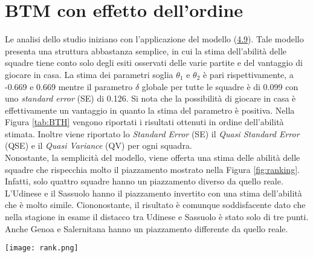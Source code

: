 \section {BTM con effetto dell'ordine}
Le analisi dello studio iniziano con l'applicazione del modello (\hyperref[for:3.9]{4.9}). Tale modello presenta una struttura abbastanza semplice, in cui la stima dell'abilità delle squadre tiene conto solo degli esiti osservati delle varie partite e del vantaggio di giocare in casa. 
La stima dei parametri soglia $\theta_1$ e $\theta_2$ è pari rispettivamente, a -0.669 e 0.669 mentre il parametro $\delta$ globale per tutte le squadre è di 0.099 con uno \emph{standard error} (SE) di 0.126. Si nota che la possibilità di giocare in casa è effettivamente un vantaggio in quanto la stima del parametro è positiva. Nella Figura \ref{tab:BTH} vengono riportati i risultati ottenuti in ordine dell'abilità stimata. Inoltre viene riportato lo \emph{Standard Error} (SE) il \emph{Quasi Standard Error} (QSE) \autocite{firth2004quasi} e il \emph{Quasi Variance} (QV)\autocite{firth2004quasi} per ogni squadra.\\
Nonostante, la semplicità del modello, viene offerta una stima delle abilità delle squadre che rispecchia molto il piazzamento mostrato nella Figura \ref{fig:ranking}. Infatti, solo quattro squadre hanno un piazzamento diverso da quello reale. L'Udinese e il Sassuolo hanno il piazzamento invertito con una stima dell'abilità che è molto simile. Ciononostante, il risultato è comunque soddisfacente dato che nella stagione in esame il distacco tra Udinese e Sassuolo è stato solo di tre punti. Anche Genoa e Salernitana hanno un piazzamento differente da quello reale.

\begin{sidewaysfigure} 
	\begin{center}
		\texttt{[image: rank.png]}
		\caption{Barplot che indica per ogni squadra l'abilità stimata dal modello (\hyperref[for:3.9]{4.9}). A fianco al grafico viene riportato lo \emph{Standard Error} (SE), il \emph{Quasi Standard Error} (QSE) e il \emph{Quasi Variance} (QV). Nel grafico viene indicato con un asterisco le squadre con un piazzamento stimato diverso da quello reale, anche esso riportato a destra del grafico.} \label{tab:BTH}
	\end{center}
\end{sidewaysfigure} 


